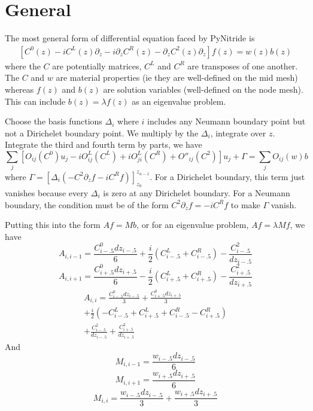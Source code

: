 \documentclass{article}
\begin{document}
\section{General}
The most general form of differential equation faced by PyNitride is 
\begin{align}
  \left[C^0(z)-iC^L(z)\partial_z-i\partial_zC^R(z)-\partial_z C^2(z) \partial_z \right] f(z) = w(z)b(z) 
\end{align}
where the $C$ are potentially matrices, $C^L$ and $C^R$ are transposes of one another. The $C$ and $w$ are material properties (ie they are well-defined on the mid mesh) whereas $f(z)$ and $b(z)$ are solution variables (well-defined on the node mesh).  This can include $b(z)=\lambda f(z)$ as an eigenvalue problem.

Choose the basis functions $\Delta_i$ where $i$ includes any Neumann boundary point but not a Dirichelet boundary point. We multiply by the $\Delta_i$, integrate over $z$. Integrate the third and fourth term by parts, we have
\[
  \sum_j \left[O_{ij}(C^0)u_j -iO^L_{ij}(C^L)+iO^L_{ji}(C^R) +O''_{ij}(C^2)\right]u_j+\Gamma=\sum_j O_{ij}(w)b
\]
where $\Gamma=\left[\Delta_i(-C^2\partial_zf-iC^Rf)\right]^{z_{n-1}}_{z_{0}}$. For a Dirichelet boundary, this term just vanishes because every $\Delta_i$ is zero at any Dirichelet boundary.  For a Neumann boundary, the condition must be of the form $C^2\partial_z f=-iC^Rf$ to make $\Gamma$ vanish.

Putting this into the form $Af= Mb$, or for an eigenvalue problem, $Af= \lambda M f$, we have
\begin{equation}
  A_{i,i-1}= \frac{C^0_{i-.5}dz_{i-.5}}{6}+\frac{i}{2}\left( C^L_{i-.5}+C^R_{i-.5} \right)-\frac{C^2_{i-.5}}{dz_{i-.5}}
\end{equation}
\begin{equation}
  A_{i,i+1}= \frac{C^0_{i+.5}dz_{i+.5}}{6}-\frac{i}{2}\left( C^L_{i+.5}+C^R_{i+.5} \right)-\frac{C^2_{i+.5}}{dz_{i+.5}}
\end{equation}
\begin{multline*}
  A_{i,i}=
    \frac{C^0_{i-.5}dz_{i-.5}}{3}+\frac{C^0_{i+.5}dz_{i+.5}}{3}\\
    +\frac{i}{2}\left( -C^L_{i-.5}+C^L_{i+.5} + C^R_{i-.5}-C^R_{i+.5}  \right)\\
    +\frac{C^2_{i-.5}}{dz_{i-.5}}+\frac{C^2_{i+.5}}{dz_{i+.5}}
\end{multline*}
And
\begin{equation*}
  M_{i,i-1}= \frac{w_{i-.5}dz_{i-.5}}{6}
\end{equation*}
\begin{equation*}
  M_{i,i+1}= \frac{w_{i+.5}dz_{i+.5}}{6}
\end{equation*}
\begin{equation*}
  M_{i,i}= \frac{w_{i-.5}dz_{i-.5}}{3}+\frac{w_{i+.5}dz_{i+.5}}{3}
\end{equation*}
\end{document}
